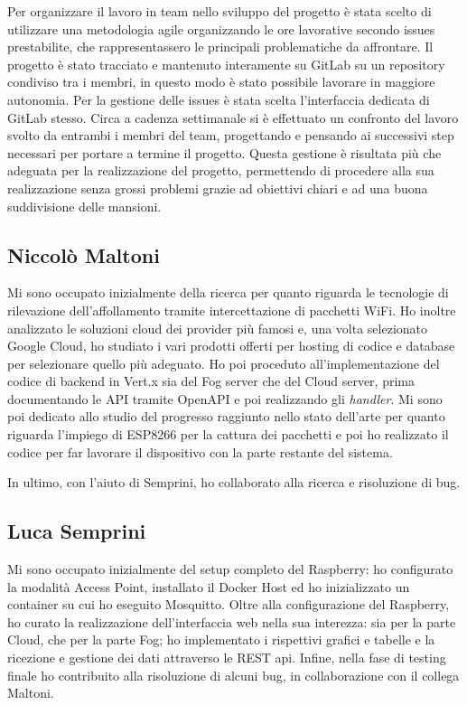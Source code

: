 Per organizzare il lavoro in team nello sviluppo del progetto è stata scelto di utilizzare
una metodologia agile organizzando le ore lavorative secondo issues prestabilite, che rappresentassero
le principali problematiche da affrontare. Il progetto è stato tracciato e mantenuto interamente su GitLab
su un repository condiviso tra i membri, in questo modo è stato possibile
lavorare in maggiore autonomia. Per la gestione delle issues è stata scelta l'interfaccia dedicata di GitLab stesso.
Circa a cadenza settimanale si è effettuato un confronto del lavoro svolto da entrambi i membri del team,
progettando e pensando ai successivi step  necessari per portare a termine il progetto.
Questa gestione è risultata più che adeguata per la
realizzazione del progetto, permettendo di procedere alla sua realizzazione senza
grossi problemi grazie ad obiettivi chiari e ad una buona suddivisione delle mansioni.

\subsection{Niccolò Maltoni}

Mi sono occupato inizialmente della ricerca per quanto riguarda le tecnologie di rilevazione dell'affollamento tramite intercettazione di pacchetti WiFi.
Ho inoltre analizzato le soluzioni cloud dei provider più famosi e, una volta selezionato Google Cloud, ho studiato i vari prodotti offerti per hosting di codice e database per selezionare quello più adeguato.
Ho poi proceduto all'implementazione del codice di backend in Vert.x sia del Fog server che del Cloud server, prima documentando le API tramite OpenAPI e poi realizzando gli \emph{handler}.
Mi sono poi dedicato allo studio del progresso raggiunto nello stato dell'arte per quanto riguarda l'impiego di ESP8266 per la cattura dei pacchetti e poi ho realizzato il codice per far lavorare il dispositivo con la parte restante del sistema.

In ultimo, con l'aiuto di Semprini, ho collaborato alla ricerca e risoluzione di bug.

\subsection{Luca Semprini}

Mi sono occupato inizialmente del setup completo del Raspberry: ho configurato la modalità Access Point, installato il Docker Host ed ho inizializzato un container su cui ho eseguito Mosquitto.
Oltre alla configurazione del Raspberry, ho curato la realizzazione dell'interfaccia web nella sua interezza: sia per la parte Cloud, che per la parte Fog; ho implementato i rispettivi grafici e tabelle e la ricezione e gestione dei dati attraverso le REST api.
Infine, nella fase di testing finale ho contribuito alla risoluzione di alcuni bug, in collaborazione con il collega Maltoni.
